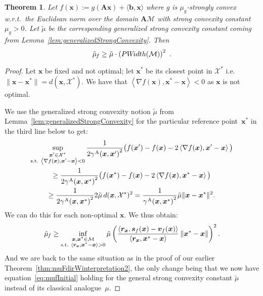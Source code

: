 \documentclass{article} %
\newtheorem{theorem}[definition]{Theorem}
\providecommand{\norm}[1]{\left\lVert#1\right\rVert}
\newcommand{\X}{\mathcal{X}}
\newcommand{\domain}{\mathcal{M}} %
\newcommand{\stepsize}{\gamma}
\newcommand{\away}{{\hspace{0.06em}\textnormal{\scriptsize A}}}
\newcommand{\x}{\bm{x}}
\newcommand{\s}{\bm{s}}
\newcommand{\vv}{\bm{v}} %
\renewcommand{\r}{\bm{r}}
\newcommand{\PWidth}{\mathop{PW\!idth}}
\newcommand{\innerProd}[2]{\left\langle #1 , #2 \right\rangle}
\newcommand{\innerProdCompressed}[2]{\langle #1 , #2 \rangle}
\newcommand{\A}{\bm{A}}
\newcommand{\bv}{\bm{b}}
\newcommand{\strongConvGeneralized}{\tilde{\mu}_{\hspace{-0.08em}f}}
\newcommand{\0}{\mathbf{0}} %
\begin{document}
\begin{theorem}\label{thm:generalizedPWidth}
Let $f(\x) := g(\A \x) + \innerProdCompressed{\bv}{\x}$ where $g$ is $\mu_g$-\emph{strongly convex} w.r.t.\ the Euclidean norm over the domain $\A \domain$ with strong convexity constant $\mu_g > 0$. Let $\tilde{\mu}$ be the corresponding generalized strong convexity constant coming from Lemma~\ref{lem:generalizedStrongConvexity}.
Then
\[
\strongConvGeneralized \geq \tilde{\mu} \cdot \left( \PWidth(\domain) \right)^2 \ .
\] 
\end{theorem}
\begin{proof}
Let $\x$ be fixed and not optimal; let $\x^*$ be its closest point in $\X^*$ i.e. $\|\x - \x^*\| = d(\x, \X^*)$. We have that $\left\langle \nabla f(\x), \x^*-\x \right\rangle < 0$ as $\x$ is not optimal.

We use the generalized strong convexity notion $\tilde{\mu}$ from Lemma~\ref{lem:generalizedStrongConvexity} for the particular reference point~$\x^*$ in the third line below to get:
\begin{multline*}
\sup_{\substack{\x' \in \X^*\\
                        \textrm{s.t. } \left\langle \nabla f(\x), \x'-\x \right\rangle < 0 }}
           \frac{1}{{2\stepsize^\away(\x,\x')}^2}
           \big( f(\x')-f(\x)-2 \left\langle \nabla f(\x),  \x'-\x \right\rangle \big)  \\
           \geq  \frac{1}{{2\stepsize^\away(\x,\x^*)}^2}
                      \big( f(\x^*)-f(\x)-2 \left\langle \nabla f(\x),  \x^*-\x \right\rangle \big) \\ 
          \geq  \frac{1}{{2\stepsize^\away(\x,\x^*)}^2} 2 \tilde{\mu}\, d(\x, \X^*)^2
          = \frac{1}{{ \stepsize^\away(\x,\x^*)}^2} \tilde{\mu} \|\x-\x^*\|^2 .                  
\end{multline*}
We can do this for each non-optimal $\x$. We thus obtain:
\begin{equation} \label{eq:muTildeInequality}
\strongConvGeneralized \geq  \inf_{\substack{\x, \x^* \in \domain\\
                                   \textrm{s.t. } \innerProd{\r_{\x}}{\x^*-\x} > 0}}
                      \tilde{\mu} \left(  \frac{\innerProd{\r_{\x}}{ \s_f(\x) - \vv_f(\x)}}{\innerProd{\r_{\x}}{\x^*-\x}} \norm{{\x^*-\x}} \right)^2 .
\end{equation}
And we are back to the same situation as in the proof of our earlier Theorem~\ref{thm:muFdirWinterpretation2}, the only change being that we now have equation~\eqref{eq:mufInitial} holding for the general strong convexity constant $\tilde{\mu}$ instead of its classical analogue~$\mu$.
\end{proof}
\end{document}
